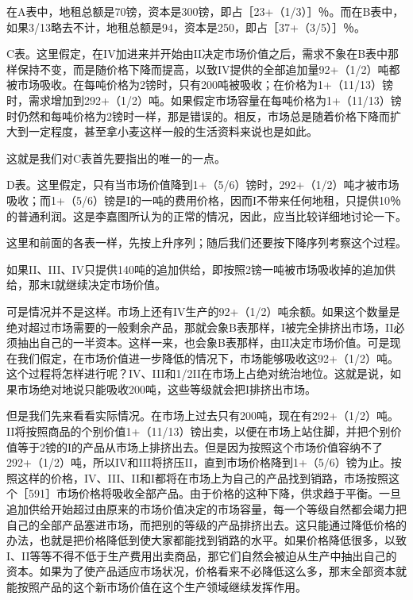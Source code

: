 在A表中，地租总额是70镑，资本是300镑，即占［23+（1/3）］％。而在B表中，如果3/13略去不计，地租总额是94，资本是250，即占［37+（3/5）］％。

C表。这里假定，在IV加进来并开始由II决定市场价值之后，需求不象在B表中那样保持不变，而是随价格下降而提高，以致IV提供的全部追加量92+（1/2）吨都被市场吸收。在每吨价格为2镑时，只有200吨被吸收；在价格为1+（11/13）镑时，需求增加到292+（1/2）吨。如果假定市场容量在每吨价格为1+（11/13）镑时仍然和每吨价格为2镑时一样，那是错误的。相反，市场总是随着价格下降而扩大到一定程度，甚至拿小麦这样一般的生活资料来说也是如此。

这就是我们对C表首先要指出的唯一的一点。

D表。这里假定，只有当市场价值降到1+（5/6）镑时，292+（1/2）吨才被市场吸收；而1+（5/6）镑是I的一吨的费用价格，因而I不带来任何地租，只提供10％的普通利润。这是李嘉图所认为的正常的情况，因此，应当比较详细地讨论一下。

这里和前面的各表一样，先按上升序列；随后我们还要按下降序列考察这个过程。

如果II、III、IV只提供140吨的追加供给，即按照2镑一吨被市场吸收掉的追加供给，那末I就继续决定市场价值。

可是情况并不是这样。市场上还有IV生产的92+（1/2）吨余额。如果这个数量是绝对超过市场需要的一般剩余产品，那就会象B表那样，I被完全排挤出市场，II必须抽出自己的一半资本。这样一来，也会象B表那样，由II决定市场价值。可是现在我们假定，在市场价值进一步降低的情况下，市场能够吸收这92+（1/2）吨。这个过程将怎样进行呢？IV、III和1/2II在市场上占绝对统治地位。这就是说，如果市场绝对地说只能吸收200吨，这些等级就会把I排挤出市场。

但是我们先来看看实际情况。在市场上过去只有200吨，现在有292+（1/2）吨。II将按照商品的个别价值1+（11/13）镑出卖，以便在市场上站住脚，并把个别价值等于2镑的I的产品从市场上排挤出去。但是因为按照这个市场价值容纳不了292+（1/2）吨，所以IV和III将挤压II，直到市场价格降到1+（5/6）镑为止。按照这样的价格，IV、III、II和I都将在市场上为自己的产品找到销路，市场按照这个［591］市场价格将吸收全部产品。由于价格的这种下降，供求趋于平衡。一旦追加供给开始超过由原来的市场价值决定的市场容量，每一个等级自然都会竭力把自己的全部产品塞进市场，而把别的等级的产品排挤出去。这只能通过降低价格的办法，也就是把价格降低到使大家都能找到销路的水平。如果价格降低很多，以致I、II等等不得不低于生产费用出卖商品，那它们自然会被迫从生产中抽出自己的资本。如果为了使产品适应市场状况，价格看来不必降低这么多，那末全部资本就能按照产品的这个新市场价值在这个生产领域继续发挥作用。

